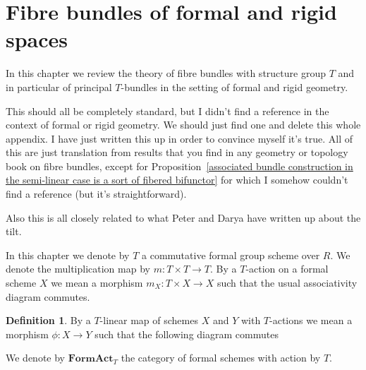 \documentclass[11pt,oneside]{amsart}
\theoremstyle{definition}
\newtheorem{definition}[theorem]{Definition}
\theoremstyle{remark}
\begin{document}
	\section{Fibre bundles of formal and rigid spaces}
	In this chapter we review the theory of fibre bundles with structure group $T$ and in particular of principal $T$-bundles in the setting of formal and rigid geometry.
	{\color{red} This should all be completely standard, but I didn't find a reference in the context of formal or rigid geometry. We should just find one and delete this whole appendix. I have just written this up in order to convince myself it's true. All of this are just translation from results that you find in any geometry or topology book on fibre bundles, except for Proposition~\ref{associated bundle construction in the semi-linear case is a sort of fibered bifunctor} for which I somehow couldn't find a reference (but it's straightforward).
		
		Also this is all closely related to what Peter and Darya have written up about the tilt. }
	
	In this chapter we denote by $T$ a commutative formal group scheme over $R$. We denote the multiplication map by $m:T\times T\rightarrow T$. By a $T$-action on a formal scheme $X$ we mean a morphism $m_X:T\times X\rightarrow X$ such that the usual associativity diagram commutes. 
	\begin{definition}
		By a $T$-linear map of schemes $X$ and $Y$ with $T$-actions we mean a morphism $\phi:X\rightarrow Y$ such that the following diagram commutes
		\begin{center}
		\end{center}
		We denote by $\mathbf{FormAct}_T$ the category of formal schemes with action by $T$.
	\end{definition}
	
\end{document}
